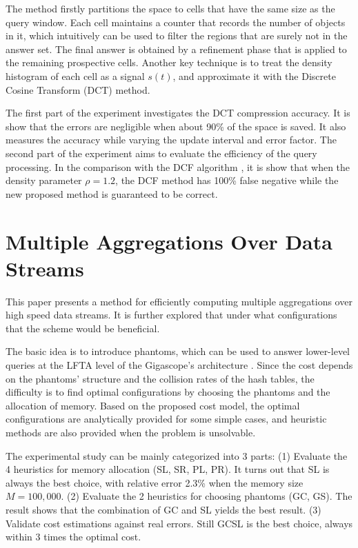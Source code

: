 \documentclass[paper=a4, fontsize=18pt]{article} %
\numberwithin{equation}{section} %
\numberwithin{figure}{section} %
\numberwithin{table}{section} %
\begin{document}
The method firstly partitions the space to cells that have the same size as the query window. Each cell maintains a counter that records the number of objects in it, which intuitively can be used to filter the regions that are surely not in the answer set. The final answer is obtained by a refinement phase that is applied to the remaining prospective cells. Another key technique is to treat the density histogram of each cell as a signal $s(t)$, and approximate it with the Discrete Cosine Transform (DCT) method.

The first part of the experiment investigates the DCT compression accuracy. It is show that the errors are negligible when about 90\% of the space is saved. It also measures the accuracy while varying the update interval and error factor. The second part of the experiment aims to evaluate the efficiency of the query processing. In the comparison with the DCF algorithm \cite{HKGT03}, it is show that when the density parameter $\rho = 1.2$, the DCF method has 100\% false negative while the new proposed method is guaranteed to be correct.


\section{Multiple Aggregations Over Data Streams \cite{ZKOS05}}

This paper presents a method for efficiently computing multiple aggregations over high speed data streams. It is further explored that under what configurations that the scheme would be beneficial.

The basic idea is to introduce phantoms, which can be used to answer lower-level queries at the LFTA level of the Gigascope's architecture \cite{CJSS03}. Since the cost depends on the phantoms' structure and the collision rates of the hash tables, the difficulty is to find optimal configurations by choosing the phantoms and the allocation of memory. Based on the proposed cost model, the optimal configurations are analytically provided for some simple cases, and heuristic methods are also provided when the problem is unsolvable.

The experimental study can be mainly categorized into 3 parts: (1) Evaluate the 4 heuristics for memory allocation (SL, SR, PL, PR). It turns out that SL is always the best choice, with relative error 2.3\% when the memory size $M = 100,000$. (2) Evaluate the 2 heuristics for choosing phantoms (GC, GS). The result shows that the combination of GC and SL yields the best result. (3) Validate cost estimations against real errors. Still GCSL is the best choice, always within 3 times the optimal cost.
\end{document}
